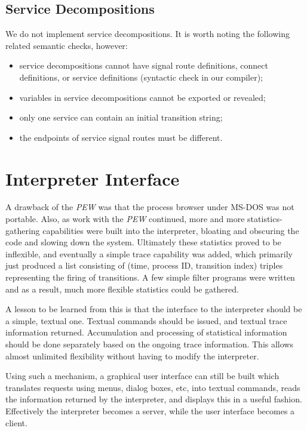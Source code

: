 \subsection{Service Decompositions}

We do not implement service decompositions. It is worth noting the
following related semantic checks, however:

\begin{itemize}
\item service decompositions cannot have signal route definitions,
connect definitions, or service definitions
(syntactic check in our compiler);
\item variables in service decompositions cannot be exported or
revealed;
\item only one service can contain an initial transition string;
\item the endpoints of service signal routes must be different.
\end{itemize}

\section{Interpreter Interface}

A drawback of the {\em PEW} was that the process browser under MS-DOS
was not portable.
Also, as work with the {\em PEW} continued, more and more
statistics-gathering capabilities were built into the interpreter,
bloating and obscuring the code and slowing down the system.
Ultimately these statistics proved to be inflexible, and eventually a
simple trace capability was added, which primarily just produced a
list consisting of (time, process ID, transition index) triples
representing the firing of transitions. A few simple filter programs
were written and as a result, much more flexible statistics could
be gathered.

A lesson to be learned from this is that the interface to the 
interpreter should be a simple, textual one. Textual commands
should be issued, and textual trace information returned.
Accumulation and processing of statistical information should be
done separately based on the ongoing trace information. This allows
almost unlimited flexibility without having to modify the
interpreter.

Using such a mechanism, a graphical user interface can still be built
which translates requests using menus, dialog boxes, etc, into 
textual commands, reads the information returned by the interpreter,
and displays this in a useful fashion. Effectively the interpreter
becomes a server, while the user interface becomes a client.

